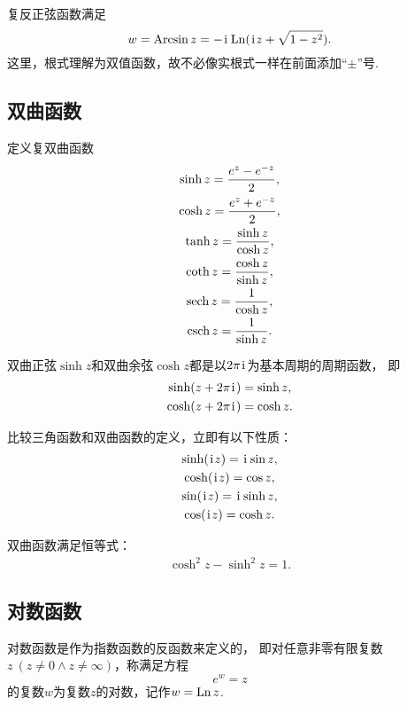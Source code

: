 \begin{property}
复反正弦函数满足\[
w = \operatorname{Arcsin} z = -\kern1pt\mathrm{i}\kern1pt \operatorname{Ln}(\kern1pt\mathrm{i}\kern1pt z + \sqrt{1-z^2}).
\]这里，根式理解为双值函数，故不必像实根式一样在前面添加“\(\pm\)”号.
\end{property}

\subsection{双曲函数}
\begin{definition}
定义复双曲函数\begin{gather}
	\sinh z = \frac{e^z-e^{-z}}{2}, \\
	\cosh z = \frac{e^z+e^{-z}}{2}, \\
	\tanh z = \frac{\sinh z}{\cosh z}, \\
	\coth z = \frac{\cosh z}{\sinh z}, \\
	\sech z = \frac{1}{\cosh z}, \\
	\csch z = \frac{1}{\sinh z}.
\end{gather}
\end{definition}

\begin{property}
双曲正弦\(\sinh z\)和双曲余弦\(\cosh z\)都是以\(2\pi\kern1pt\mathrm{i}\kern1pt\)为基本周期的周期函数，
即\begin{gather}
	\sinh(z+2\pi\kern1pt\mathrm{i}\kern1pt) = \sinh z, \\
	\cosh(z+2\pi\kern1pt\mathrm{i}\kern1pt) = \cosh z.
\end{gather}
\end{property}

\begin{property}
比较三角函数和双曲函数的定义，立即有以下性质：\begin{gather}
	\sinh(\kern1pt\mathrm{i}\kern1pt z) = \kern1pt\mathrm{i}\kern1pt\sin z, \\
	\cosh(\kern1pt\mathrm{i}\kern1pt z) = \cos z, \\
	\sin(\kern1pt\mathrm{i}\kern1pt z) = \kern1pt\mathrm{i}\kern1pt\sinh z, \\
	\cos(\kern1pt\mathrm{i}\kern1pt z) = \cosh z.
\end{gather}
\end{property}

\begin{property}
双曲函数满足恒等式：\begin{gather}
	\cosh^2 z - \sinh^2 z = 1.
\end{gather}
\end{property}

\subsection{对数函数}
对数函数是作为指数函数的反函数来定义的，
即对任意非零有限复数\(z\ (z \neq 0 \land z \neq \infty)\)，称满足方程\[
	e^w = z
\]的复数\(w\)为复数\(z\)的对数，记作\(w = \operatorname{Ln} z\).

